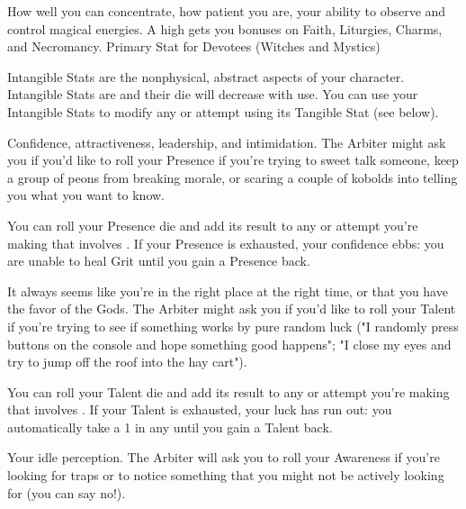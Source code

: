 {

How well you can concentrate, how patient you are, your ability to observe and control magical energies. A high \FOC gets you bonuses on Faith, Liturgies, Charms, and Necromancy. Primary Stat for Devotees (Witches and Mystics)

\cbreak




Intangible Stats are the nonphysical, abstract aspects of your character. Intangible Stats are \UD and their die will decrease with use.  You can use your Intangible Stats to modify any \RO or \RB attempt using its  Tangible Stat (see below).



Confidence, attractiveness, leadership, and intimidation. The Arbiter might ask you if you'd like to roll your Presence \UD if you're trying to sweet talk someone, keep a group of peons from breaking morale, or scaring a couple of kobolds into telling you what you want to know. 

You can roll your Presence die and add its result to any \RO or \RB attempt you're making that involves \VIG.  If your Presence is exhausted, your confidence ebbs: you are unable to heal Grit until you gain a Presence \UD back.



It always seems like you're in the right place at the right time, or that you have the favor of the Gods. The Arbiter might ask you if you'd like to roll your Talent \UD if you're trying to see if something works by pure random luck ("I randomly press buttons on the console and hope something good happens"; "I close my eyes and try to jump off the roof into the hay cart").  

You can roll your Talent die and add its result to any \RO or \RB attempt you're making that involves \DEX.  If your Talent is exhausted, your luck has run out: you automatically take a 1 in any  until you gain a Talent \UD back.



Your idle perception.  The Arbiter will ask you to roll your Awareness if you're looking for traps or to  notice something that you might not be actively looking for (you can say no!).  

}
